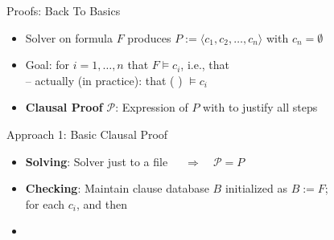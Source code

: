 \documentclass[t,english]{sdqbeamer}
\begin{document}
\begin{frame}{Proofs: Back To Basics}
	\begin{itemize}
		\item Solver on  formula $F$ produces  $P := \langle c_1, c_2, \ldots, c_n \rangle$ with $c_n = \emptyset$
		\item Goal:  for $i=1, \ldots, n$ that $F \models c_{i}$, i.e., that \\[1mm]
		-- actually (in practice): that (\,\,) $\models c_i$
		\item \textbf{Clausal Proof} $\mathcal{P}$: Expression of $P$ with  to justify all steps \pause {}
	\end{itemize}
	
	\vspace*{3mm}
	\pause
	\begin{blueblock}{Approach 1: Basic Clausal Proof}
		\begin{itemize}
			\item \textbf{Solving}: Solver just  to a file\ \ \ $\Rightarrow$\ \ $\mathcal{P} = P$
			\item \textbf{Checking}: Maintain clause database $B$ initialized as $B := F$;\\
			for each $c_i$,  and then 
			\pause
			\item {}
		\end{itemize}
	\end{blueblock}
\end{frame}
\end{document}
